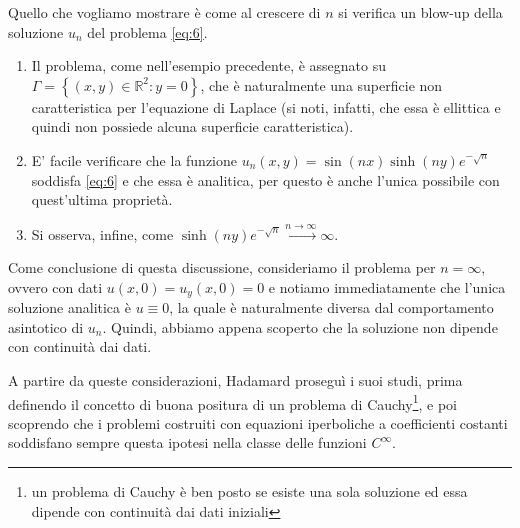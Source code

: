 Quello che vogliamo mostrare è come al crescere di $n$ si verifica un blow-up della soluzione $u_n$ del problema \eqref{eq:6}.
\begin{enumerate}[1.]
\item
Il problema, come nell'esempio precedente, è assegnato su $\Gamma=\left\lbrace(x,y) \in \mathbb{R}^2:y=0\right\rbrace$, che è naturalmente una superficie non caratteristica per l'equazione di Laplace (si noti, infatti, che essa è ellittica e quindi non possiede alcuna superficie caratteristica).
\item
E' facile verificare che la funzione $u_n(x,y)=\sin(nx)\sinh(ny)e^{-\sqrt{n}}$ soddisfa \eqref{eq:6} e che essa è analitica, per questo è anche l'unica possibile con quest'ultima proprietà.
\item
Si osserva, infine, come $\sinh(ny)e^{-\sqrt{n}}\xrightarrow{n\rightarrow\infty} \infty$.
\end{enumerate}
Come conclusione di questa discussione, consideriamo il problema per ${n=\infty}$, ovvero con dati $u(x,0)=u_y(x,0)=0$ e notiamo immediatamente che l'unica soluzione analitica è $u\equiv0$, la quale è naturalmente diversa dal comportamento asintotico di $u_n$. Quindi, abbiamo appena scoperto che la soluzione non dipende con continuità dai dati.

A partire da queste considerazioni, Hadamard proseguì i suoi studi, prima definendo il concetto di buona positura di un problema di Cauchy\footnote{un problema di Cauchy è ben posto se esiste una sola soluzione ed essa dipende con continuità dai dati iniziali}, e poi scoprendo che i problemi costruiti con equazioni iperboliche a coefficienti costanti soddisfano sempre questa ipotesi nella classe delle funzioni $C^\infty$.

